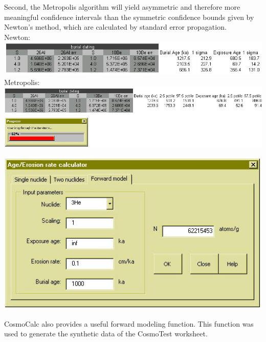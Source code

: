 \documentclass[12pt]{article}
\begin{document}
\begin{minipage}[tbp]{\textwidth}
Second, the Metropolis algorithm will yield asymmetric and therefore more meaningful
confidence intervals than the symmetric confidence bounds given by Newton's method, which
are calculated by standard error propagation.\\
Newton:\\
   \includegraphics[width = .9\textwidth]{twoNuclideNewtonResults.jpg}\\
Metropolis:\\
   \includegraphics[width = \textwidth]{twoNuclideMetropolisResults.jpg}
\end{minipage}

\begin{minipage}[tbp]{\textwidth}
  \begin{center}
  \includegraphics[width=.6\textwidth]{forward.jpg}\\
  \end{center}
  CosmoCalc  also provides  a useful  forward modeling  function. This
  function was  used to generate  the synthetic data of  the CosmoTest
  worksheet.
  \\
\end{minipage}
\end{document}
